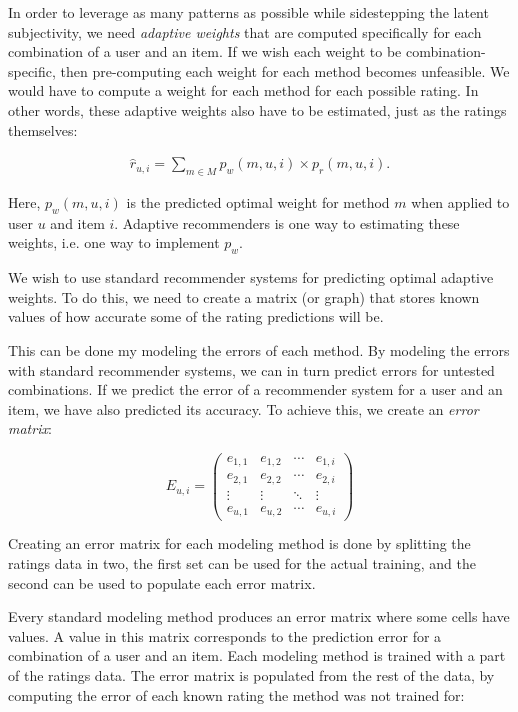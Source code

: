 In order to leverage as many patterns as possible while sidestepping the latent subjectivity,
we need \emph{adaptive weights} that are computed specifically for each combination of a user and an item.
If we wish each weight to be combination-specific, then pre-computing each weight for each method becomes unfeasible.
We would have to compute a weight for each method for each possible rating.
In other words, these adaptive weights also have to be estimated, just as the ratings themselves:

\begin{eqnarray*}
  \hat{r}_{u,i} = \sum_{m \in M} p_{w}(m,u,i) \times p_{r}(m,u,i).
\end{eqnarray*}

Here, $p_w(m,u,i)$ is the predicted optimal weight for method $m$ when applied to user $u$ and item $i$.
Adaptive recommenders is one way to estimating these weights, i.e. one way to implement $p_w$.

We wish to use standard recommender systems for predicting optimal adaptive weights.
To do this, we need to create a matrix (or graph)
that stores known values of how accurate some of the rating predictions will be.

This can be done my modeling the errors of each method.
By modeling the errors with standard recommender systems,
we can in turn predict errors for untested combinations.
If we predict the error of a recommender system for a user and an item,
we have also predicted its accuracy.
To achieve this, we create an \emph{error matrix}:

\begin{equation*}
 E_{u,i} =
 \begin{pmatrix}
    e_{1,1} & e_{1,2} & \cdots & e_{1,i} \\
    e_{2,1} & e_{2,2} & \cdots & e_{2,i} \\
    \vdots  & \vdots  & \ddots & \vdots  \\
    e_{u,1} & e_{u,2} & \cdots & e_{u,i}
 \end{pmatrix}
\end{equation*}

Creating an error matrix for each modeling method is done by splitting the ratings data in two,
the first set can be used for the actual training, and the second
can be used to populate each error matrix.

Every standard modeling method produces an error matrix where some cells have values.
A value in this matrix corresponds to the prediction error for a combination of a user and an item.
Each modeling method is trained with a part of the ratings data.
The error matrix is populated from the rest of the data,
by computing the error of each known rating the method was not trained for:

